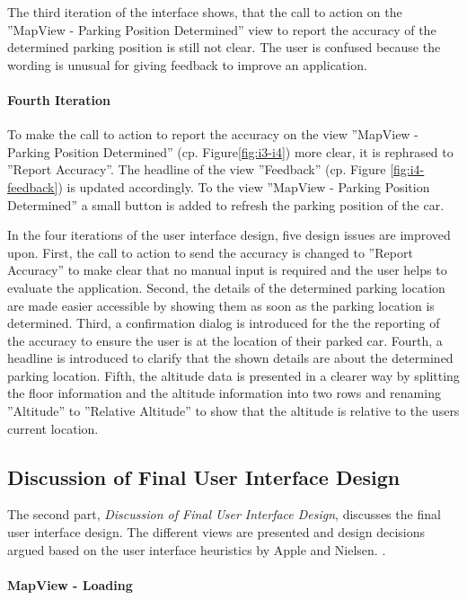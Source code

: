 The third iteration of the interface shows, that the call to action on the ''MapView - Parking Position Determined'' view to report the accuracy of the determined parking position is still not clear. The user is confused because the wording is unusual for giving feedback to improve an application.

\paragraph{Fourth Iteration}

To make the call to action to report the accuracy on the view ''MapView - Parking Position Determined'' (cp. Figure\ref{fig:i3-i4}) more clear, it is rephrased to ''Report Accuracy''. The headline of the view ''Feedback'' (cp. Figure \ref{fig:i4-feedback}) is updated accordingly. To the view ''MapView - Parking Position Determined'' a small button is added to refresh the parking position of the car. 


In the four iterations of the user interface design, five design issues are improved upon. First, the call to action to send the accuracy is changed to ''Report Accuracy'' to make clear that no manual input is required and the user helps to evaluate the application. Second, the details of the determined parking location are made easier accessible by showing them as soon as the parking location is determined. Third, a confirmation dialog is introduced for the the reporting of the accuracy to ensure the user is at the location of their parked car. Fourth, a headline is introduced to clarify that the shown details are about the determined parking location. Fifth, the altitude data is presented in a clearer way by splitting the floor information and the altitude information into two rows and renaming ''Altitude'' to ''Relative Altitude'' to show that the altitude is relative to the users current location.


\subsection{Discussion of Final User Interface Design}

The second part, \textit{Discussion of Final User Interface Design}, discusses the final user interface design. The different views are presented and design decisions argued based on the user interface heuristics by Apple and Nielsen. \cite{nielsen1994usability} \cite{apple:interfaceguidliines}.

\paragraph{MapView - Loading}


